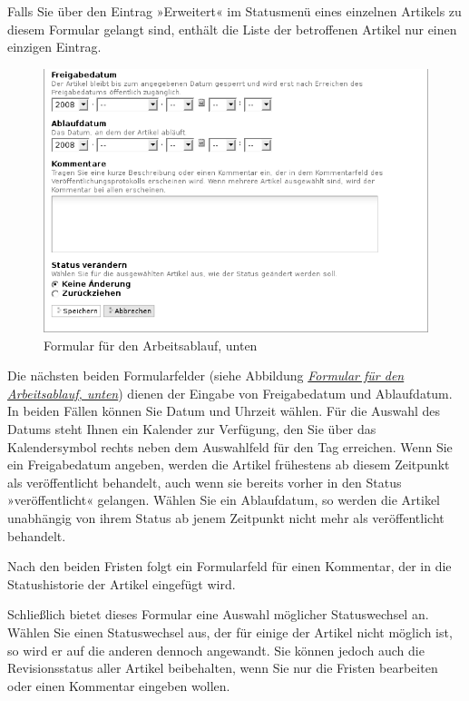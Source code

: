 \documentclass[a4paper,12pt,ngerman]{manual}
\begin{document}
Falls Sie über den Eintrag »Erweitert« im Statusmenü eines einzelnen
Artikels zu diesem Formular gelangt sind, enthält die Liste der
betroffenen Artikel nur einen einzigen Eintrag.
\hypertarget{fig-publikationsprozess-2}{}\begin{figure}[htbp]
\centering

\includegraphics{publikationsprozess-2.png}
\caption{Formular für den Arbeitsablauf, unten}\end{figure}

Die nächsten beiden Formularfelder (siehe Abbildung
\hyperlink{fig-publikationsprozess-2}{\emph{Formular für den Arbeitsablauf, unten}}) dienen der Eingabe von Freigabedatum
und Ablaufdatum. In beiden Fällen können Sie Datum und Uhrzeit
wählen. Für die Auswahl des Datums steht Ihnen ein Kalender zur
Verfügung, den Sie über das Kalendersymbol rechts neben dem
Auswahlfeld für den Tag erreichen. Wenn Sie ein Freigabedatum angeben,
werden die Artikel frühestens ab diesem Zeitpunkt als veröffentlicht
behandelt, auch wenn sie bereits vorher in den Status »veröffentlicht«
gelangen. Wählen Sie ein Ablaufdatum, so werden die Artikel unabhängig
von ihrem Status ab jenem Zeitpunkt nicht mehr als veröffentlicht
behandelt.

Nach den beiden Fristen folgt ein Formularfeld für einen Kommentar,
der in die Statushistorie der Artikel eingefügt wird.

Schließlich bietet dieses Formular eine Auswahl möglicher
Statuswechsel an.  Wählen Sie einen Statuswechsel aus, der für einige
der Artikel nicht möglich ist, so wird er auf die anderen dennoch
angewandt. Sie können jedoch auch die Revisionsstatus aller Artikel
beibehalten, wenn Sie nur die Fristen bearbeiten oder einen Kommentar
eingeben wollen.
\end{document}

